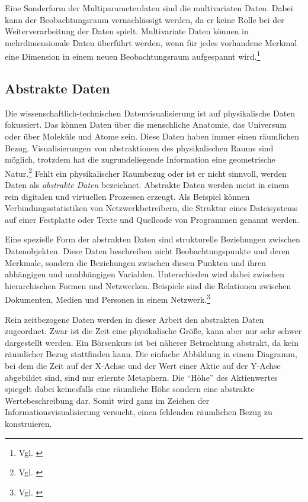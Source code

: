 \documentclass[a4paper, 12pt, DIVcalc, onepage, pdftex, headsepline, footsepline]{scrreprt}
\begin{document}
Eine Sonderform der Multiparameterdaten sind die multivariaten Daten. Dabei kann
der Beobachtungsraum vernachlässigt werden, da er keine Rolle bei der Weiterverarbeitung
der Daten spielt. Multivariate Daten können in mehrdimensionale Daten überführt werden,
wenn für jedes vorhandene Merkmal eine Dimension in einem neuen Beobachtungsraum
aufgespannt wird.\footnote{Vgl. \citep[S.\,172]{Schumann}}

\subsection{Abstrakte Daten}
Die wissenschaftlich-technischen Datenvisualisierung ist auf physikalische Daten fokussiert.
Das können Daten über die menschliche Anatomie, das Universum oder über Moleküle und Atome sein. Diese Daten
haben immer einen räumlichen Bezug. Visualisierungen von abstraktionen des physikalischen Raums
sind möglich, trotzdem hat die zugrundeliegende Information eine geometrische Natur.\footnote{Vgl. \citep[S.\,6]{Card}}
Fehlt ein physikalischer Raumbezug oder ist er nicht sinnvoll, werden Daten als \textit{abstrakte Daten} bezeichnet.
Abstrakte Daten werden meist in einem rein digitalen und virtuellen Prozessen erzeugt. Als Beispiel
können Verbindungsstatistiken von Netzwerkbetreibern, die Struktur eines Dateisystems auf einer
Festplatte oder Texte und Quellcode von Programmen genannt werden.

Eine spezielle Form der abstrakten Daten sind strukturelle Beziehungen zwischen Datenobjekten.
Diese Daten beschreiben nicht Beobachtungspunkte und deren Merkmale, sondern die Beziehungen
zwischen diesen Punkten und ihren abhängigen und unabhängigen Variablen. Unterschieden wird dabei
zwischen hierarchischen Formen und Netzwerken. Beispiele sind die Relationen zwischen Dokumenten,
Medien und Personen in einem Netzwerk.\footnote{Vgl. \citep{Preim}}

Rein zeitbezogene Daten werden in dieser Arbeit den abstrakten Daten zugeordnet. Zwar ist die Zeit eine physikalische
Größe, kann aber nur sehr schwer dargestellt werden. Ein Börsenkurs ist bei näherer Betrachtung
abstrakt, da kein räumlicher Bezug stattfinden kann.
Die einfache Abbildung in einem Diagramm, bei dem die Zeit auf der X-Achse und der Wert einer Aktie auf der Y-Achse
abgebildet sind, sind nur erlernte Metaphern. Die "`Höhe"' des Aktienwertes spiegelt dabei keinesfalls eine räumliche
Höhe sondern eine abstrakte Wertebeschreibung dar. Somit wird ganz im Zeichen der Informationsvisualisierung versucht,
einen fehlenden räumlichen Bezug zu konstruieren.
\end{document}
